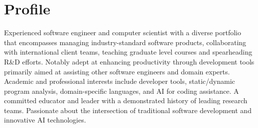 \documentclass[12pt,a4paper,sans]{moderncv}
\begin{document}
\pagestyle{empty}
\makecvtitle

\section{Profile}
Experienced software engineer and computer scientist with a diverse portfolio that encompasses managing industry-standard software products, collaborating with international client teams, teaching graduate level courses and spearheading R\&D efforts. Notably adept at enhancing productivity through development tools primarily aimed at assisting other software engineers and domain experts. Academic and professional interests include developer tools, static/dynamic program analysis, domain-specific languages, and AI for coding assistance. A committed educator and leader with a demonstrated history of leading research teams. Passionate about the intersection of traditional software development and innovative AI technologies.
\end{document}

